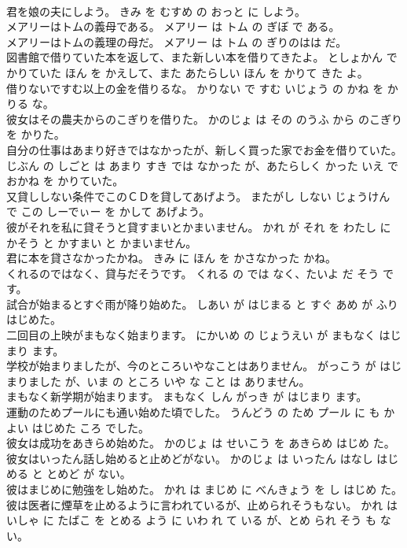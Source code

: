 \documentclass[8pt]{extreport}
\begin{document}
\begin{CJK}{UTF8}{min}
\\	君を娘の夫にしよう。	きみ を むすめ の おっと に しよう。	
\\	メアリーはトムの義母である。	メアリー は トム の ぎぼ で ある。	
\\	メアリーはトムの義理の母だ。	メアリー は トム の ぎりのはは だ。	
\\	図書館で借りていた本を返して、また新しい本を借りてきたよ。	としょかん で かりていた ほん を かえして、また あたらしい ほん を かりて きた よ。	
\\	借りないですむ以上の金を借りるな。	かりない で すむ いじょう の かね を かりる な。	
\\	彼女はその農夫からのこぎりを借りた。	かのじょ は その のうふ から のこぎり を かりた。	
\\	自分の仕事はあまり好きではなかったが、新しく買った家でお金を借りていた。	じぶん の しごと は あまり すき では なかった が、あたらしく かった いえ で おかね を かりていた。	
\\	又貸ししない条件でこのＣＤを貸してあげよう。	またがし しない じょうけん で この しーでぃー を かして あげよう。	
\\	彼がそれを私に貸そうと貸すまいとかまいません。	かれ が それ を わたし に かそう と かすまい と かまいません。	
\\	君に本を貸さなかったかね。	きみ に ほん を かさなかった かね。	
\\	くれるのではなく、貸与だそうです。	くれる の では なく、たいよ だ そう です。	
\\	試合が始まるとすぐ雨が降り始めた。	しあい が はじまる と すぐ あめ が ふり はじめた。	
\\	二回目の上映がまもなく始まります。	にかいめ の じょうえい が まもなく はじまり ます。	
\\	学校が始まりましたが、今のところいやなことはありません。	がっこう が はじまりました が、いま の ところ いや な こと は ありません。	
\\	まもなく新学期が始まります。	まもなく しん がっき が はじまり ます。	
\\	運動のためプールにも通い始めた頃でした。	うんどう の ため プール に も かよい はじめた ころ でした。	
\\	彼女は成功をあきらめ始めた。	かのじょ は せいこう を あきらめ はじめ た。	
\\	彼女はいったん話し始めると止めどがない。	かのじょ は いったん はなし はじめる と とめど が ない。	
\\	彼はまじめに勉強をし始めた。	かれ は まじめ に べんきょう を し はじめ た。	
\\	彼は医者に煙草を止めるように言われているが、止められそうもない。	かれ は いしゃ に たばこ を とめる よう に いわ れ て いる が、とめ られ そう も ない。	

\end{CJK}
\end{document}
